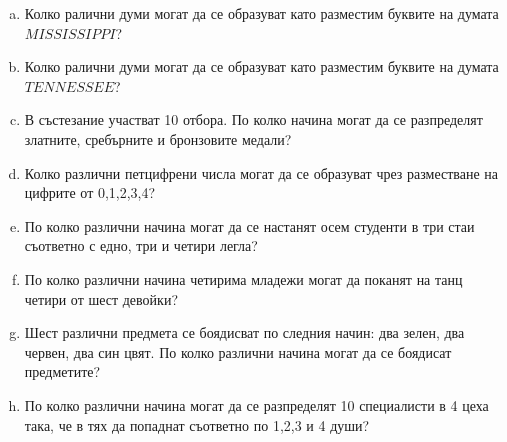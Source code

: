 
\begin{problem}
  \begin{enumerate}[a)]
  \item
    Колко ралични думи могат да се образуват като разместим буквите на думата $MISSISSIPPI$?
  \item
    Колко ралични думи могат да се образуват като разместим буквите на думата $TENNESSEE$?
  \item
    В състезание участват 10 отбора. 
    По колко начина могат да се разпределят златните, сребърните и бронзовите медали?
  \item
    Колко различни петцифрени числа могат да се образуват чрез разместване на цифрите от 0,1,2,3,4?
  \item
    По колко различни начина могат да се настанят осем студенти в три стаи съответно с едно, три и четири легла?
  \item
    По колко различни начина четирима младежи могат да поканят на танц четири от шест девойки?
  \item
    Шест различни предмета се боядисват по следния начин: два зелен, два червен, два син цвят.
    По колко различни начина могат да се боядисат предметите?  
  \item
    По колко различни начина могат да се разпределят 10 специалисти в 4 цеха така, че в тях да попаднат съответно по 1,2,3 и 4 души?
  \end{enumerate}
\end{problem}



